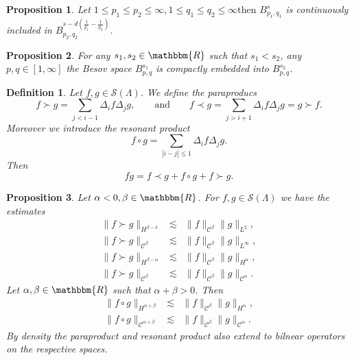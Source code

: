 \documentclass[11pt, oneside]{article}   	%
\newtheorem{definition}{Definition}
\newtheorem{proposition}{Proposition}
{\theorembodyfont{\rmfamily}\newtheorem{remark}{Remark}}
\newcommand{\VV}{\mathscr{C}}
\newcommand{\CS}{\mathscr{S}}
\begin{document}
\begin{proposition}
  \label{besovembedding}Let $1 \leqslant p_1 \leqslant p_2 \leqslant \infty, 1
  \leqslant q_1 \leqslant q_2 \leqslant \infty \text{then } B^s_{p_1, q_1}$ is
  continuously included in $B_{p_2, q_2}^{s - d \left( \frac{1}{p_1} -
  \frac{1}{p_2} \right)}$.
\end{proposition}

\begin{proposition}
  \label{compactembedding}For any $s_1, s_2 \in \mathbbm{R}$ such that $s_1 <
  s_2$, any $p, q \in [1, \infty]$ the Besov space $B^{s_1}_{p, q}$ is
  compactly embedded into $B^{s_2}_{p, q}$.
\end{proposition}

\begin{definition}
  Let $ f, g \in \mathcal{\CS} (\Lambda)$. We define the
  paraproducs
  \[ f \succ g = \sum_{j < i - 1} \Delta_i f \Delta_j g, \qquad \text{and}
     \qquad f \prec g = \sum_{j > i + 1} \Delta_i f \Delta_j g = g \succ f. \]
  Moreover we introduce the resonant product
  \[ f \circ g = \sum_{| i - j | \leqslant 1} \Delta_i f \Delta_j g. \]
  Then
  \[ fg = f \prec g + f \circ g + f \succ g. \]
\end{definition}

\begin{proposition}
  \label{paraproductestimate}Let $\alpha < 0, \beta \in \mathbbm{R}$. For
  $ f, g \in \CS (\Lambda)$ we have the estimates
  \begin{eqnarray*}
    \| f \succ g \|_{H^{\beta - \delta}} & \lesssim & \| f \|_{\VV^{\beta}} \|
    g \|_{L^2},\\
    \| f \succ g \|_{\VV^{\beta}} & \lesssim & \| f \|_{\VV^{\beta}} \| g
    \|_{L^{\infty}},\\
    \| f \succ g \|_{H^{\beta - \alpha}} & \lesssim & \| f \|_{\VV^{\beta}} \|
    g \|_{H^{\alpha}},\\
    \| f \succ g \|_{\VV^{\beta}} & \lesssim & \| f \|_{\VV^{\beta}} \| g
    \|_{\VV^{\alpha}} .
  \end{eqnarray*}
  Let $\alpha, \beta \in \mathbbm{R}$ such that $\alpha + \beta > 0$. Then
  \begin{eqnarray*}
    \| f \circ g \|_{H^{\alpha + \beta}} & \lesssim & \| f \|_{\VV^{\beta}} \|
    g \|_{H^{\alpha}},\\
    \| f \circ g \|_{\VV^{\alpha + \beta}} & \lesssim & \| f \|_{\VV^{\beta}}
    \| g \|_{\VV^{\alpha}} .
  \end{eqnarray*}
  By density the paraproduct and resonant product also extend to bilnear
  operators on the respective spaces. 
\end{proposition}
\end{document}
